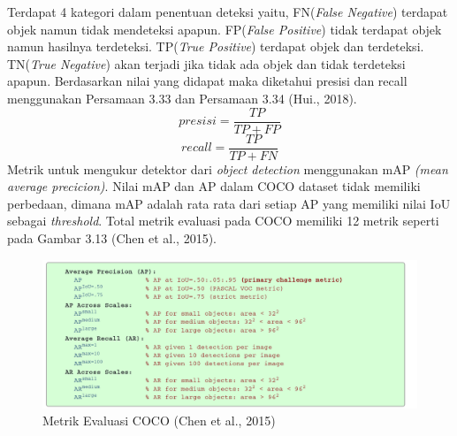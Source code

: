 Terdapat 4 kategori dalam penentuan deteksi yaitu,
FN(\emph{False Negative}) terdapat objek namun tidak mendeteksi apapun.
FP(\emph{False Positive}) tidak terdapat objek namun hasilnya terdeteksi.
TP(\emph{True Positive}) terdapat objek dan terdeteksi.
TN(\emph{True Negative}) akan terjadi jika tidak ada objek dan tidak terdeteksi apapun.
Berdasarkan nilai yang didapat maka diketahui presisi dan recall menggunakan Persamaan 3.33 dan Persamaan 3.34 (Hui., 2018).
\begin{equation}
	presisi = \frac{TP}{TP+FP}
\end{equation}
\begin{equation}
recall = \frac{TP}{TP+FN}
\end{equation}
Metrik untuk mengukur detektor dari \emph{object detection} menggunakan mAP \emph{(mean average precicion)}. Nilai mAP dan AP dalam COCO dataset tidak memiliki perbedaan, dimana mAP adalah rata rata dari setiap AP yang memiliki nilai IoU sebagai \emph{threshold}. Total metrik evaluasi pada COCO memiliki 12 metrik seperti pada Gambar 3.13 (Chen et al., 2015).
\begin{figure}[H]
	\centering
	\includegraphics[width=1\linewidth]{mtrik}
	\caption{Metrik Evaluasi COCO (Chen et al., 2015)}
	\label{fig:mtrik}
\end{figure}

